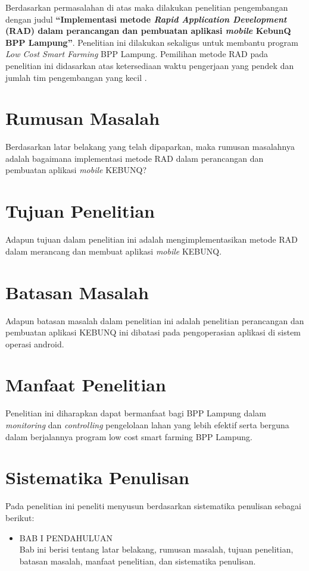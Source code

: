 \begin{flushleft}
\begin{justify}
    Berdasarkan permasalahan di atas maka dilakukan penelitian pengembangan dengan judul \textbf{“Implementasi metode \textit{Rapid Application Development} (RAD) dalam perancangan dan pembuatan aplikasi \textit{mobile} KebunQ BPP Lampung”}.  Penelitian ini dilakukan sekaligus untuk membantu program \textit{Low Cost Smart Farming} BPP Lampung. Pemilihan metode RAD pada penelitian ini didasarkan atas ketersediaan waktu pengerjaan yang pendek \cite{Sukamto} dan jumlah tim pengembangan yang kecil \cite{jurnal empiris}.
\\

    \section{Rumusan Masalah}
      Berdasarkan latar belakang yang telah dipaparkan, maka rumusan masalahnya adalah bagaimana implementasi metode RAD dalam perancangan dan pembuatan aplikasi \textit{mobile} KEBUNQ?
      \\
    \section{Tujuan Penelitian}
      Adapun tujuan dalam penelitian ini adalah mengimplementasikan metode RAD dalam merancang dan membuat aplikasi \textit{mobile} KEBUNQ.
      \\
    \section{Batasan Masalah}
      Adapun batasan masalah dalam penelitian ini adalah penelitian perancangan dan pembuatan aplikasi KEBUNQ ini dibatasi pada pengoperasian aplikasi di sistem operasi android.
      \\
    \section{Manfaat Penelitian}
    Penelitian ini diharapkan dapat bermanfaat bagi BPP Lampung dalam \textit{monitoring} dan \textit{controlling} pengelolaan lahan yang lebih efektif serta berguna dalam berjalannya program low cost smart farming BPP Lampung.
    \\


    \section{Sistematika Penulisan}
    Pada penelitian ini peneliti menyusun berdasarkan sistematika penulisan sebagai berikut: 
      \begin{itemize}
        \item BAB I PENDAHULUAN
        \\
        Bab ini berisi tentang latar belakang, rumusan masalah, tujuan penelitian, 
        batasan masalah, manfaat penelitian, dan sistematika penulisan.


\end{itemize}
\end{justify}
\end{flushleft}
